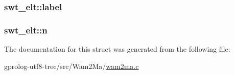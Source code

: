 \subsubsection[{\texorpdfstring{label}{label}}]{ swt\+\_\+elt\+::label}\hypertarget{structswt__elt_a979d2691c64643e5d59f471a3e5e40f6}{}\label{structswt__elt_a979d2691c64643e5d59f471a3e5e40f6}
\subsubsection[{\texorpdfstring{n}{n}}]{ swt\+\_\+elt\+::n}\hypertarget{structswt__elt_aa3fb3cf68a09b57a7abad92d1888d297}{}\label{structswt__elt_aa3fb3cf68a09b57a7abad92d1888d297}


The documentation for this struct was generated from the following file\+:\begin{DoxyCompactItemize}
\item 
gprolog-\/utf8-\/tree/src/\+Wam2\+Ma/\hyperlink{wam2ma_8c}{wam2ma.\+c}\end{DoxyCompactItemize}
